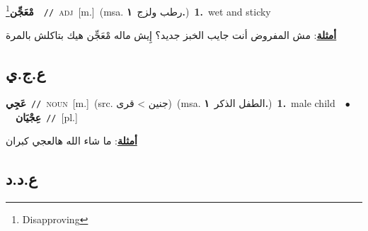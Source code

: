 \documentclass[10pt,a4paper,twoside]{article} %
\begin{document}
\begin{multicols}{2}
{\setlength\topsep{0pt}\textbf{\foreignlanguage{arabic}{مْعَجِّن}}\footnote{Disapproving}\ \ {\color{gray}\texttt{//}\color{black}}\ \textsc{adj}\ [m.]\ \color{gray}(msa. \foreignlanguage{arabic}{رطب ولزج}~\foreignlanguage{arabic}{\textbf{١.}})\color{black}\ \textbf{1.}~wet and sticky\  \begin{flushright}\color{gray}\foreignlanguage{arabic}{\textbf{\underline{\foreignlanguage{arabic}{أمثلة}}}: مش المفروض أنت جايب الخبز جديد؟ إِيش ماله مْعَجِّن هيك بتاكلش بالمرة}\end{flushright}\color{black}} \vspace{2mm}

\vspace{-3mm}
\subsection*{\color{blue}\foreignlanguage{arabic}{ع.ج.ي}\color{blue}{}} 

{\setlength\topsep{0pt}\textbf{\foreignlanguage{arabic}{عَجِي}}\ {\color{gray}\texttt{//}\color{black}}\ \textsc{noun}\ [m.]\ (src. \color{gray}\foreignlanguage{arabic}{جنين > قرى}\color{black})\ \color{gray}(msa. \foreignlanguage{arabic}{الطفل الذكر}~\foreignlanguage{arabic}{\textbf{١.}})\color{black}\ \textbf{1.}~male child\ \ $\bullet$\ \ \setlength\topsep{0pt}\textbf{\foreignlanguage{arabic}{عِجْيَان}}\ {\color{gray}\texttt{//}\color{black}}\ [pl.]\  \begin{flushright}\color{gray}\foreignlanguage{arabic}{\textbf{\underline{\foreignlanguage{arabic}{أمثلة}}}: ما شاء الله هالعجي كبران}\end{flushright}\color{black}} \vspace{2mm}

\vspace{-3mm}
\subsection*{\color{blue}\foreignlanguage{arabic}{ع.د.د}\color{blue}{}} 


\end{multicols}
\end{document}

